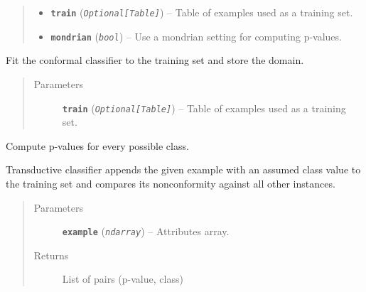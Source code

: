 \documentclass[letterpaper,10pt,english]{sphinxmanual}
\begin{document}
\begin{fulllineitems}
\begin{fulllineitems}
\begin{quote}
\begin{description}
\begin{itemize}
\item {} 
\textbf{\texttt{train}} (\emph{\texttt{Optional{[}Table{]}}}) -- Table of examples used as a training set.

\item {} 
\textbf{\texttt{mondrian}} (\emph{\texttt{bool}}) -- Use a mondrian setting for computing p-values.

\end{itemize}

\end{description}\end{quote}

\end{fulllineitems}


\begin{fulllineitems}
\label{cp.classification:cp.classification.TransductiveClassifier.fit}
Fit the conformal classifier to the training set and store the domain.
\begin{quote}\begin{description}
\item[{Parameters}] \leavevmode
\textbf{\texttt{train}} (\emph{\texttt{Optional{[}Table{]}}}) -- Table of examples used as a training set.

\end{description}\end{quote}

\end{fulllineitems}


\begin{fulllineitems}
\label{cp.classification:cp.classification.TransductiveClassifier.p_values}
Compute p-values for every possible class.

Transductive classifier appends the given example with an assumed class value to the training set
and compares its nonconformity against all other instances.
\begin{quote}\begin{description}
\item[{Parameters}] \leavevmode
\textbf{\texttt{example}} (\emph{\texttt{ndarray}}) -- Attributes array.

\item[{Returns}] \leavevmode
List of pairs (p-value, class)

\end{description}\end{quote}

\end{fulllineitems}


\end{fulllineitems}
\end{document}
